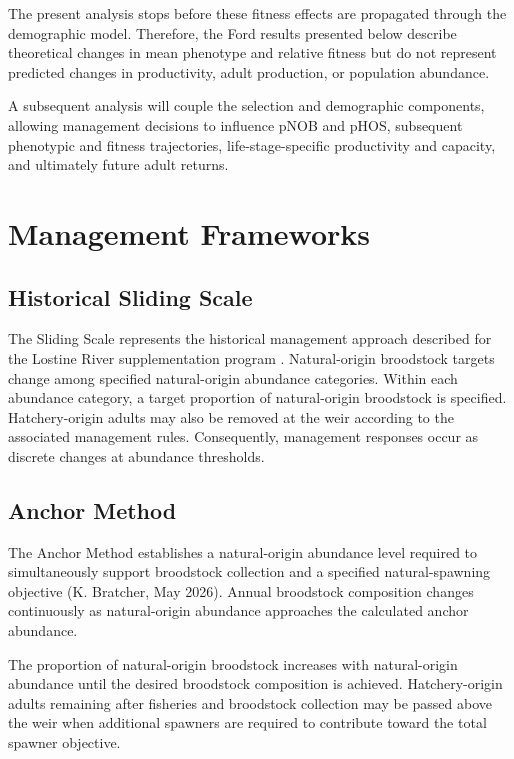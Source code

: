 \documentclass[12pt,letterpaper]{article}
\begin{document}
The present analysis stops before these fitness effects are propagated through the demographic model. Therefore, the Ford results presented below describe theoretical changes in mean phenotype and relative fitness but do not represent predicted changes in productivity, adult production, or population abundance.

A subsequent analysis will couple the selection and demographic components, allowing management decisions to influence pNOB and pHOS, subsequent phenotypic and fitness trajectories, life-stage-specific productivity and capacity, and ultimately future adult returns.

\section{Management Frameworks}\label{management-frameworks}

\subsection{Historical Sliding Scale}\label{historical-sliding-scale}

The Sliding Scale represents the historical management approach described for
the Lostine River supplementation program \autocite{npt_hatchery_2011}. Natural-origin broodstock targets change among specified natural-origin abundance categories. Within each abundance category, a target proportion of natural-origin broodstock is specified. Hatchery-origin adults may also be removed at the weir according to the associated management rules. Consequently, management responses occur as discrete changes at abundance thresholds.

\subsection{Anchor Method}\label{anchor-method}

The Anchor Method establishes a natural-origin abundance level required to
simultaneously support broodstock collection and a specified natural-spawning
objective (K. Bratcher, May 2026). Annual broodstock composition changes continuously as natural-origin abundance approaches the calculated anchor abundance.

The proportion of natural-origin broodstock increases with natural-origin
abundance until the desired broodstock composition is achieved. Hatchery-origin
adults remaining after fisheries and broodstock collection may be passed above
the weir when additional spawners are required to contribute toward the total
spawner objective.
\end{document}
